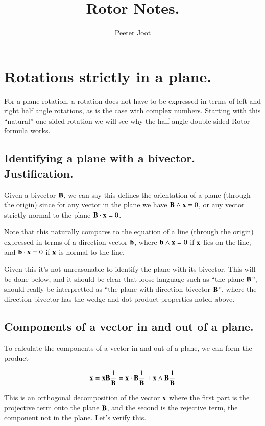 \documentclass{article}      %
\title{ Rotor Notes. } %
\author{Peeter Joot}         %
\begin{document}

\maketitle{}

\section{ Rotations strictly in a plane. }

For a plane rotation, a rotation does not have to
be expressed in terms of left and right half angle rotations, as is the case
with complex numbers.  Starting with this ``natural'' one sided rotation
we will see why the half angle double sided Rotor formula works.

\subsection{ Identifying a plane with a bivector.  Justification. }
Given a bivector $\mathbf{B}$, we can say this defines the orientation of a plane
(through the origin)
since for any vector in the plane we have $\mathbf{B} \wedge \mathbf{x} = 0$, or any vector
strictly normal to the plane $\mathbf{B} \cdot \mathbf{x} = 0$.

Note that this naturally compares
to the equation of a line (through the origin) expressed in terms of a
direction vector $\mathbf{b}$,
where $\mathbf{b} \wedge \mathbf{x}=0$ if $\mathbf{x}$ lies on the line, and $\mathbf{b} \cdot \mathbf{x} = 0$
if $\mathbf{x}$ is normal to the line.

Given this it's not unreasonable to identify the plane with its bivector.  This
will be done below, and it should be clear that 
loose language such as ``the plane $\mathbf{B}$'', should really be interpretted
as ``the plane with direction bivector $\mathbf{B}$'', where the direction bivector
has the wedge and dot product properties noted above.

\subsection{ Components of a vector in and out of a plane. }

To calculate the components of a vector in and out of a plane, we can form
the product

\[
\mathbf{x} = \mathbf{x} \mathbf{B} \frac{1}{\mathbf{B}} = \mathbf{x} \cdot \mathbf{B} \frac{1}{\mathbf{B}} + \mathbf{x} \wedge \mathbf{B} \frac{1}{\mathbf{B}}
\]

This is an orthogonal decomposition of the vector $\mathbf{x}$ where the first
part is the projective term onto the plane $\mathbf{B}$, and the second is the rejective
term, the component not in the plane.  Let's verify this.
\end{document}
